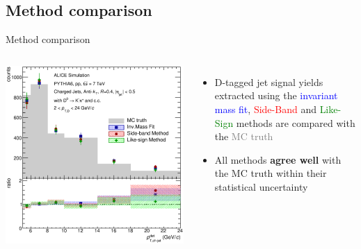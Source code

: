 \documentclass{beamer}
\begin{document}
\subsection{Method comparison}
\begin{frame}{Method comparison}
\begin{columns}
\includegraphics[width=\textwidth]{img/HQ16_Simulation_MethodComparison}
\begin{itemize}
\item D-tagged jet signal yields extracted using the  \textcolor{blue}{invariant mass fit}, \textcolor{red}{Side-Band} and  \textcolor{green}{Like-Sign} methods are compared with the  \textcolor{gray}{MC truth}
\item All methods \textbf{agree well} with the MC truth within their statistical uncertainty
\end{itemize}
\end{columns}
\end{frame}
\end{document}
